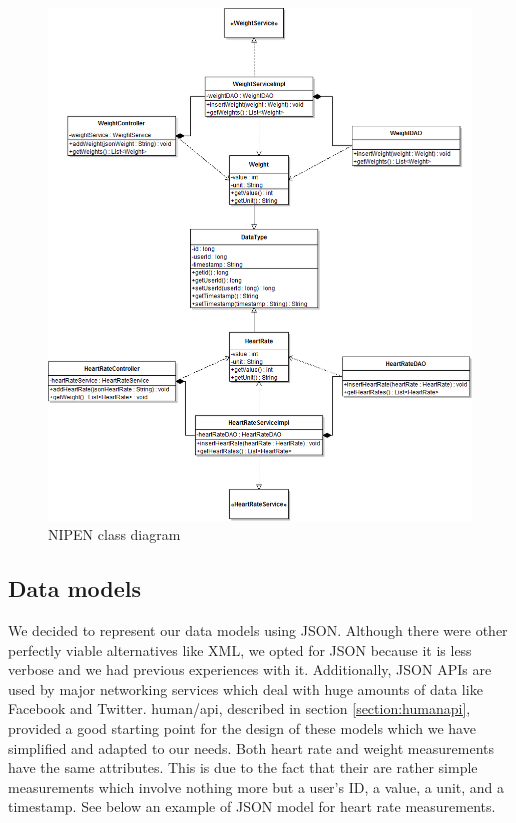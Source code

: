 \begin{figure}[h]
\centering
\includegraphics[scale=0.5]{../Figures/NIPEN-class-diagram.png}
\caption{NIPEN class diagram}
\label{figure:nipen-class-diagram}
\end{figure}
\clearpage

\subsection{Data models}
\label{subsec:models}

We decided to represent our data models using JSON.
Although there were other perfectly viable alternatives like XML,
we opted for JSON because it is less verbose and we had previous experiences with it.
Additionally, JSON APIs are used by major networking services which deal with huge amounts of
data like Facebook and Twitter.
human/api, described in section \ref{section:humanapi}, provided a good starting point for the design of
these models which we have simplified and adapted to our needs.
Both heart rate and weight measurements have the same attributes.
This is due to the fact that their are rather simple measurements which involve nothing more but
a user's ID, a value, a unit, and a timestamp.
See below an example of JSON model for heart rate measurements.

